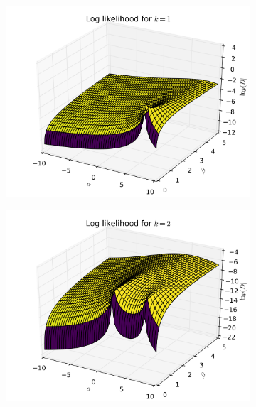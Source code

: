 \documentclass[a4paper]{article}
\begin{document}
 \begin{figure}
        \centering
        \begin{subfigure}[b]{0.475\textwidth}
            \centering
            \includegraphics[width=\textwidth]{Images/1_3_2_1.png}
        \end{subfigure}
        \hfill
        \begin{subfigure}[b]{0.475\textwidth}  
            \centering 
            \includegraphics[width=\textwidth]{Images/1_3_2_2.png}
            

\end{subfigure}
\end{figure}
\end{document}
